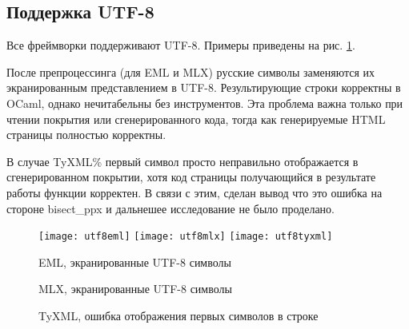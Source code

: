 \subsection{Поддержка UTF-8}

Все фреймворки поддерживают UTF-8.
Примеры приведены на рис. \ref{fig:utf8}.

После препроцессинга (для EML и MLX) русские символы заменяются их экранированным представлением в UTF-8.
Результирующие строки корректны в OCaml, однако нечитабельны без инструментов.
Эта проблема важна только при чтении покрытия или сгенерированного кода, тогда как генерируемые HTML страницы полностью корректны.

В случае TyXML\% первый символ просто неправильно отображается в сгенерированном покрытии, хотя код страницы получающийся в результате работы функции корректен.
В связи с этим, сделан вывод что это ошибка на стороне bisect\_ppx и дальнешее исследование не было проделано.

\begin{figure}[ht!]
    \texttt{[image: utf8eml]}\hfill
    \texttt{[image: utf8mlx]}\hfill
    \texttt{[image: utf8tyxml]}
    \caption{EML, экранированные UTF-8 символы}
    \caption{MLX, экранированные UTF-8 символы}
    \caption{TyXML, ошибка отображения первых символов в строке}
    \label{fig:utf8}
\end{figure}
